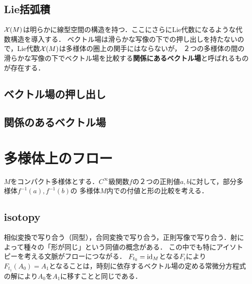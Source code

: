 \documentclass[uplatex,dvipdfmx]{jsreport}
\begin{document}
\subsection{Lie括弧積}

\begin{tcolorbox}[colframe=ForestGreen, colback=ForestGreen!10!white,breakable,colbacktitle=ForestGreen!40!white,coltitle=black,fonttitle=\bfseries\sffamily,
title=]
    $\mathcal{X}(M)$は明らかに線型空間の構造を持つ．ここにさらにLie代数になるような代数構造を導入する．
    ベクトル場は滑らかな写像の下での押し出しを持たないので，Lie代数$\mathcal{X}(M)$は多様体の圏上の関手にはならないが，
    ２つの多様体の間の滑らかな写像の下でベクトル場を比較する\textbf{関係にあるベクトル場}と呼ばれるものが存在する．
\end{tcolorbox}

\begin{definition}
    
\end{definition}

\subsection{ベクトル場の押し出し}

\subsection{関係のあるベクトル場}

\section{多様体上のフロー}

\begin{tcolorbox}[colframe=ForestGreen, colback=ForestGreen!10!white,breakable,colbacktitle=ForestGreen!40!white,coltitle=black,fonttitle=\bfseries\sffamily,
title=]
    $M$をコンパクト多様体とする．$C^\infty$級関数$f$の２つの正則値$a,b$に対して，部分多様体$f^{-1}(a),f^{-1}(b)$の
    多様体$M$内での付値と形の比較を考える．
\end{tcolorbox}

\subsection{isotopy}

\begin{tcolorbox}[colframe=ForestGreen, colback=ForestGreen!10!white,breakable,colbacktitle=ForestGreen!40!white,coltitle=black,fonttitle=\bfseries\sffamily,
title=]
    相似変換で写り合う（同型），合同変換で写り合う，正則写像で写り合う．射によって種々の「形が同じ」という同値の概念がある．
    この中でも特にアイソトピーを考える文脈がフローにつながる．
    $F_{t_0}=\mathrm{id}_M$となる$F_t$により$F_{t_1}(A_0)=A_1$となることは，時刻に依存するベクトル場の定める常微分方程式の解により$A_0$を$A_1$に移すことと同じである．
\end{tcolorbox}
\end{document}
